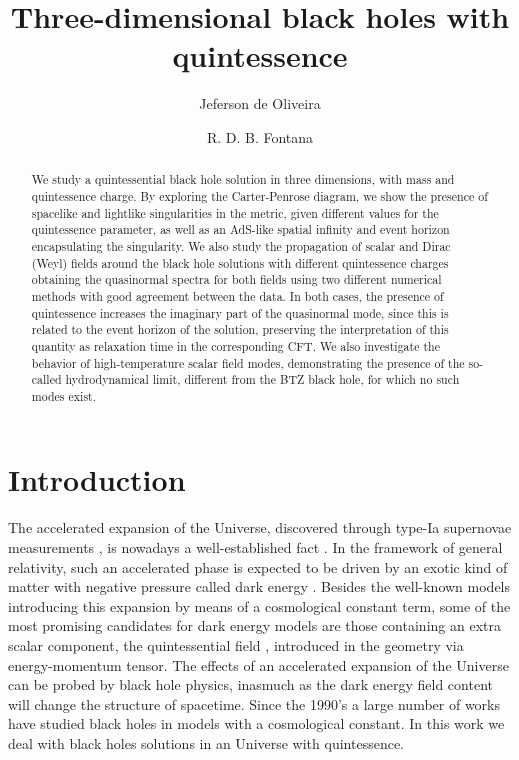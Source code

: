 \documentclass[preprint]{revtex4-1}
\begin{document}
\title{Three-dimensional black holes with quintessence}

\author{Jeferson de Oliveira}

\author{R. D. B. Fontana}


\date{}

\begin{abstract}

We study a quintessential black hole solution in three dimensions, with mass and quintessence charge.  By exploring the Carter-Penrose diagram, we show the presence of spacelike and lightlike singularities in the metric, given different values for the quintessence parameter, as well as an AdS-like spatial infinity and event horizon encapsulating the singularity. We also study the propagation of scalar and Dirac (Weyl) fields around the black hole solutions with different quintessence charges obtaining the quasinormal spectra for both fields using two different numerical methods with good agreement between the data. In both cases, the presence of quintessence increases the imaginary part of the quasinormal mode, since this is related to the event horizon of the solution, preserving the interpretation of this quantity as relaxation time in the corresponding CFT. We also investigate the behavior of high-temperature scalar field modes, demonstrating the presence of the so-called hydrodynamical limit, different from the BTZ black hole, for which no such modes exist.
\end{abstract} 

\maketitle

\section{Introduction}

The accelerated expansion of the Universe, discovered through type-Ia supernovae measurements \cite{Perlmutter:1998np,Riess:1998cb}, is nowadays a well-established fact . In the framework of general relativity, such an accelerated phase is expected to be driven by an exotic kind of matter with negative pressure called dark energy \cite{RevModPhys.75.559, Wang:2016lxa}. Besides the well-known models introducing this expansion by means of a cosmological constant term, some of the most promising candidates for dark energy models are those containing an extra scalar component, the quintessential field \cite{doi:10.1142/S021827180600942X}, introduced in the geometry via energy-momentum tensor. The effects of an accelerated expansion of the Universe can be probed by black hole physics, inasmuch as the dark energy field content will change the structure of spacetime. Since the 1990's a large number of works have studied black holes in models with a cosmological constant. In this work we deal with black holes solutions in an Universe with quintessence. 
\end{document}
